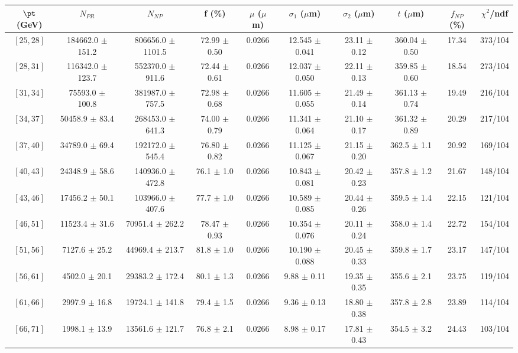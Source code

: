 \begin{tabular}{c||c|c|c|c|c|c|c||c|c}
$\pt$ (GeV) & $N_{PR}$ & $N_{NP}$ & f (\%) & $\mu$ ($\mu$m) & $\sigma_1$ ($\mu$m) & $\sigma_2$ ($\mu$m)  & $t$ ($\mu$m) & $f_{NP}$ (\%) & $\chi^2$/ndf \\
\hline
$[25, 28]$ & 184662.0 $\pm$ 151.2 & 806656.0 $\pm$ 1101.5 & 72.99 $\pm$ 0.50 & 0.0266 & 12.545 $\pm$ 0.041 & 23.11 $\pm$ 0.12 & 360.04 $\pm$ 0.50 & 17.34 & 373/104\\
$[28, 31]$ & 116342.0 $\pm$ 123.7 & 552370.0 $\pm$ 911.6 & 72.44 $\pm$ 0.61 & 0.0266 & 12.037 $\pm$ 0.050 & 22.11 $\pm$ 0.13 & 359.85 $\pm$ 0.60 & 18.54 & 273/104\\
$[31, 34]$ & 75593.0 $\pm$ 100.8 & 381987.0 $\pm$ 757.5 & 72.98 $\pm$ 0.68 & 0.0266 & 11.605 $\pm$ 0.055 & 21.49 $\pm$ 0.14 & 361.13 $\pm$ 0.74 & 19.49 & 216/104\\
$[34, 37]$ & 50458.9 $\pm$ 83.4 & 268453.0 $\pm$ 641.3 & 74.00 $\pm$ 0.79 & 0.0266 & 11.341 $\pm$ 0.064 & 21.10 $\pm$ 0.17 & 361.32 $\pm$ 0.89 & 20.29 & 217/104\\
$[37, 40]$ & 34789.0 $\pm$ 69.4 & 192172.0 $\pm$ 545.4 & 76.80 $\pm$ 0.82 & 0.0266 & 11.125 $\pm$ 0.067 & 21.15 $\pm$ 0.20 & 362.5 $\pm$ 1.1 & 20.92 & 169/104\\
$[40, 43]$ & 24348.9 $\pm$ 58.6 & 140936.0 $\pm$ 472.8 & 76.1 $\pm$ 1.0 & 0.0266 & 10.843 $\pm$ 0.081 & 20.42 $\pm$ 0.23 & 357.8 $\pm$ 1.2 & 21.67 & 148/104\\
$[43, 46]$ & 17456.2 $\pm$ 50.1 & 103966.0 $\pm$ 407.6 & 77.7 $\pm$ 1.0 & 0.0266 & 10.589 $\pm$ 0.085 & 20.44 $\pm$ 0.26 & 359.5 $\pm$ 1.4 & 22.15 & 121/104\\
$[46, 51]$ & 11523.4 $\pm$ 31.6 & 70951.4 $\pm$ 262.2 & 78.47 $\pm$ 0.93 & 0.0266 & 10.354 $\pm$ 0.076 & 20.11 $\pm$ 0.24 & 358.0 $\pm$ 1.4 & 22.72 & 154/104\\
$[51, 56]$ & 7127.6 $\pm$ 25.2 & 44969.4 $\pm$ 213.7 & 81.8 $\pm$ 1.0 & 0.0266 & 10.190 $\pm$ 0.088 & 20.45 $\pm$ 0.33 & 359.8 $\pm$ 1.7 & 23.17 & 147/104\\
$[56, 61]$ & 4502.0 $\pm$ 20.1 & 29383.2 $\pm$ 172.4 & 80.1 $\pm$ 1.3 & 0.0266 & 9.88 $\pm$ 0.11 & 19.35 $\pm$ 0.35 & 355.6 $\pm$ 2.1 & 23.75 & 119/104\\
$[61, 66]$ & 2997.9 $\pm$ 16.8 & 19724.1 $\pm$ 141.8 & 79.4 $\pm$ 1.5 & 0.0266 & 9.36 $\pm$ 0.13 & 18.80 $\pm$ 0.38 & 357.8 $\pm$ 2.8 & 23.89 & 114/104\\
$[66, 71]$ & 1998.1 $\pm$ 13.9 & 13561.6 $\pm$ 121.7 & 76.8 $\pm$ 2.1 & 0.0266 & 8.98 $\pm$ 0.17 & 17.81 $\pm$ 0.43 & 354.5 $\pm$ 3.2 & 24.43 & 103/104\\

\end{tabular}
